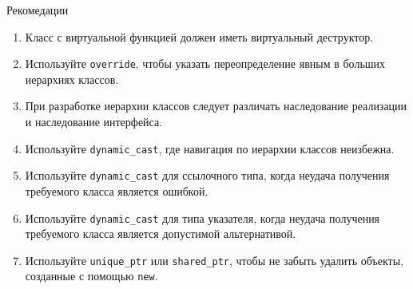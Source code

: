 \documentclass[
    8pt,
    hyperref={pdfencoding=unicode}
    ]{beamer}
\theoremstyle{definition}
\begin{document}
\begin{frame}{Рекомедации}
\begin{enumerate}
        \item Класс с виртуальной функцией должен иметь виртуальный деструктор.
        \item Используйте \texttt{override}, чтобы указать переопределение явным в больших иерархиях классов.
        \item При разработке иерархии классов следует различать наследование реализации и наследование интерфейса.
        \item Используйте \texttt{dynamic_cast}, где навигация по иерархии классов неизбежна.
        \item Используйте \texttt{dynamic_cast} для ссылочного типа, когда неудача получения требуемого класса является ошибкой.
        \item Используйте \texttt{dynamic_cast} для типа указателя, когда неудача получения требуемого класса является допустимой альтернативой.
        \item Используйте \texttt{unique_ptr} или \texttt{shared_ptr}, чтобы не забыть удалить объекты, созданные с помощью \texttt{new}.
    \end{enumerate}
\end{frame}
\end{document}
